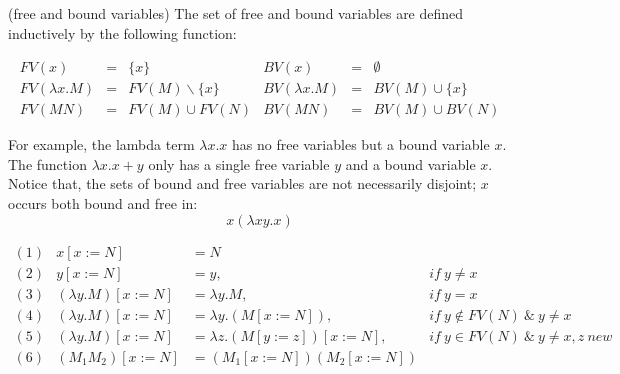 \begin{def1}
\normalfont (free and bound variables) The set of free and bound variables are defined inductively by the following function:
\end{def1}

\begin{equation*}\label{eq:fv}
\begin{array}{lcllcl}
FV(x)           & = & \{x\}             & BV(x)           &=& \emptyset\\
FV(\lambda x.M) & = & FV(M)\backslash \{x\} & BV(\lambda x.M) &=& BV(M)\cup \{x\}\\
FV(MN)          & = & FV(M)\cup FV(N) & BV(MN)          &=& BV(M)\cup BV(N)
\end{array}
\end{equation*}


For example, the lambda term $\lambda x.x$ has no free variables but a bound variable $x$. The function $\lambda x.x+y$ only has a single free variable $y$ and a bound variable $x$. 
Notice that, the sets of bound and free variables are not necessarily disjoint; $x$ occurs both bound and free in:
\begin{equation*}
x(\lambda xy.x)
\end{equation*}

\begin{comment}
\section{Substitution}

\noindent A cursory approach to define the substitution operation leads to the problem of \textit{variable capture}. It occurs when we substitute a term containing a free variable into a scope where the variable becomes bound. For example:
\begin{equation*}
(\lambda xy.xy)y \neq \lambda y.yy
\end{equation*} 

The free occurrence of y in the left hand term becomes confused with the bound variable after substitution.To avoid \textit{variable capture}, we define a capture-avoiding susbstiution. The notion $[x:=N]$ indicates the replacement of a variable $x$ by a term $N$:
\end{comment}
\begin{equation*}
\begin{array}{lrll}
(1)&x[x:=N]&=N & ~\\
(2)&y[x:=N]&=y,& if\ y\neq x\\
(3)&(\lambda y.M)[x:=N]&=\lambda y.M,& if\ y=x\\
(4)&(\lambda y.M)[x:=N]&=\lambda y.(M[x:=N]),& if\ y\notin FV(N)\ \& \ y\neq x\\
(5)&(\lambda y.M)[x:=N]&=\lambda z.(M[y:=z])[x:=N],& if\ y\in FV(N)\ \& \ y\neq x,z\  new\\
(6)&(M_1M_2)[x:=N] &= (M_1[x:=N])(M_2[x:=N])&
\end{array}
\end{equation*}

